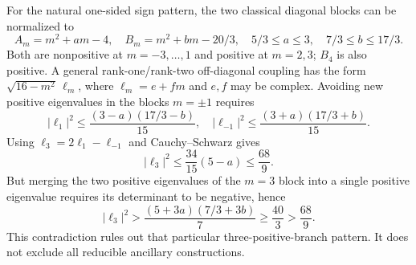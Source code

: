 \documentclass[11pt]{article}
\begin{document}
For the natural one-sided sign pattern, the two classical diagonal blocks
can be normalized to
\[
 A_m=m^2+am-4,\quad B_m=m^2+bm-20/3,
 \quad 5/3\le a\le3,\quad7/3\le b\le17/3.
\]
Both are nonpositive at $m=-3,\ldots,1$ and positive at $m=2,3$; $B_4$ is
also positive. A general rank-one/rank-two off-diagonal coupling has the
form $\sqrt{16-m^2}\,\ell_m$, where $\ell_m=e+fm$ and $e,f$ may be
complex. Avoiding new positive eigenvalues in the blocks $m=\pm1$ requires
\[
 |\ell_1|^2\le\frac{(3-a)(17/3-b)}{15},\quad
 |\ell_{-1}|^2\le\frac{(3+a)(17/3+b)}{15}.
\]
Using $\ell_3=2\ell_1-\ell_{-1}$ and Cauchy--Schwarz gives
\[
 |\ell_3|^2\le\frac{34}{15}(5-a)\le\frac{68}{9}.
\]
But merging the two positive eigenvalues of the $m=3$ block into a single
positive eigenvalue requires its determinant to be negative, hence
\[
 |\ell_3|^2>
 \frac{(5+3a)(7/3+3b)}7\ge\frac{40}{3}>\frac{68}{9}.
\]
This contradiction rules out that particular three-positive-branch
pattern. It does not exclude all reducible ancillary constructions.
\end{document}
